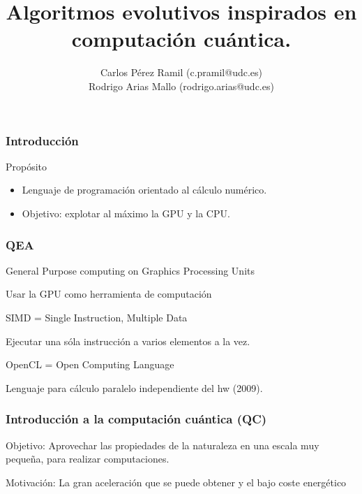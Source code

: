 \documentclass{beamer}
\title{Algoritmos evolutivos inspirados en computación cuántica.}
\author{Carlos Pérez Ramil (c.pramil@udc.es)\\
	Rodrigo Arias Mallo (rodrigo.arias@udc.es)}
\begin{document}




\frame{\titlepage}



\begin{frame}
\frametitle{Introducción}
\begin{block}{Propósito}
\begin{itemize}
\item Lenguaje de programación orientado al cálculo numérico.
\item Objetivo: explotar al máximo la GPU y la CPU.
\end{itemize}
\end{block}
\end{frame}

\begin{frame}
\frametitle{QEA}


General	Purpose computing on Graphics Processing Units

Usar la GPU como herramienta de computación

\pause

SIMD = Single Instruction, Multiple Data

Ejecutar una sóla instrucción a varios elementos a la vez.

\pause

OpenCL = Open Computing Language

Lenguaje para cálculo paralelo independiente del hw (2009).


\end{frame}



\begin{frame}
\frametitle{Introducción a la computación cuántica (QC)}
Objetivo: Aprovechar las propiedades de la naturaleza en una escala muy pequeña, 
para realizar computaciones.

\pause

Motivación: La gran aceleración que se puede obtener y el bajo coste energético

\end{frame}
\end{document}
